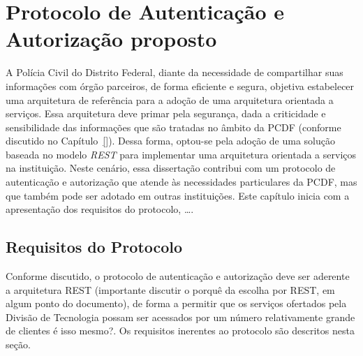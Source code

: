 \chapter{Protocolo de Autenticação e Autorização proposto}\label{cap:Protocolo}



A Polícia Civil do Distrito Federal, diante da necessidade de compartilhar suas informações com órgão parceiros, de forma eficiente e segura,
objetiva estabelecer uma arquitetura de referência para a adoção de uma arquitetura orientada a servi\c cos. Essa arquitetura deve primar pela segurança,
dada a criticidade e sensibilidade das informações que são tratadas no âmbito da PCDF ({\color{red}conforme discutido no Cap\'{i}tulo~\ref{}}).
Dessa forma, optou-se pela ado\c c\~{a}o de uma solu\c c\~{a}o {\color{red}baseada no modelo \emph{REST}} para implementar uma arquitetura orientada a servi\c cos
na instituição. Neste cen\'{a}rio, essa disserta\c c\~{a}o contribui com um protocolo de autenticação e autorização que atende às
necessidades particulares da PCDF, mas que tamb\'{e}m pode ser adotado em outras institui\c c\~{o}es. {\color{red}Este cap\'{i}tulo inicia com a apresenta\c c\~{a}o
dos requisitos do protocolo, \ldots}.

\section{Requisitos do Protocolo}\label{sec:reqprotocolo}

Conforme discutido, o protocolo de autenticação e autorização deve ser aderente a arquitetura REST ({\color{blue}importante discutir o porqu\^{e} da escolha por REST, em algum ponto do documento}), de forma a permitir que os serviços ofertados pela Divisão de Tecnologia possam ser acessados por um número relativamente grande de clientes {\color{red}\'{e} isso mesmo?}.
Os requisitos inerentes ao protocolo são descritos nesta seção.

